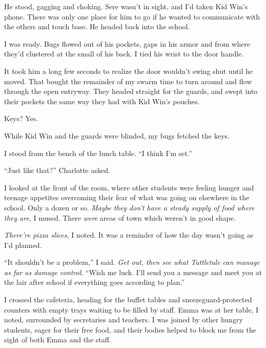 He stood, gagging and choking.  Sere wasn't in sight, and I'd taken Kid Win's phone.  There was only one place for him to go if he wanted to communicate with the others and touch base.  He headed back into the school.



I was ready.  Bugs flowed out of his pockets, gaps in his armor and from where they'd clustered at the small of his back.  I tied his wrist to the door handle.



It took him a long few seconds to realize the door wouldn't swing shut until he moved.  That bought the remainder of my swarm time to turn around and flow through the open entryway.  They headed straight for the guards, and swept into their pockets the same way they had with Kid Win's pouches.



Keys?  Yes.



While Kid Win and the guards were blinded, my bugs fetched the keys.



I stood from the bench of the lunch table.  ``I think I'm set.''



``Just like that?'' Charlotte asked.



I looked at the front of the room, where other students were feeling hunger and teenage appetites overcoming their fear of what was going on elsewhere in the school.  Only a dozen or so.  \emph{Maybe they don't have a steady supply of food where they are}, I mused.  There \emph{were} areas of town which weren't in good shape.



\emph{There're pizza slices}, I noted.  It was a reminder of how the day wasn't going as I'd planned.



``It shouldn't be a problem,'' I said.  \emph{Get out, then see what Tattletale can manage as far as damage control}.  ``Wish me luck.  I'll send you a message and meet you at the lair after school if everything goes according to plan.''



I crossed the cafeteria, heading for the buffet tables and sneezeguard-protected counters with empty trays waiting to be filled by staff.  Emma was at her table, I noted, surrounded by secretaries and teachers.  I was joined by other hungry students, eager for their free food, and their bodies helped to block me from the sight of both Emma and the staff.



